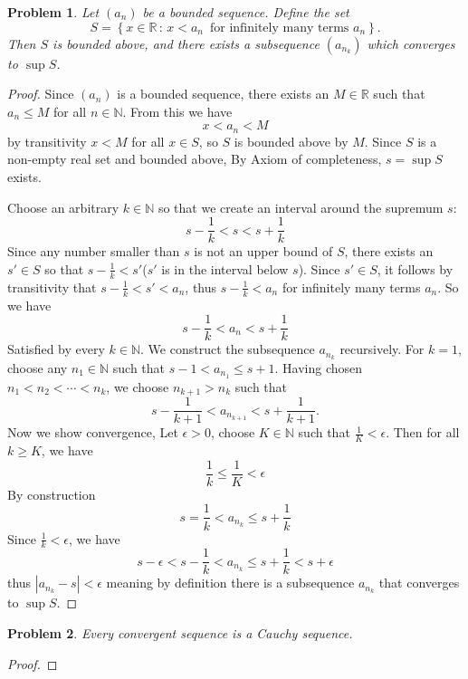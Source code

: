 \documentclass[12pt]{article}
\newtheorem{problem}{Problem}
\newcommand{\NN}{\ensuremath{\mathbb N}}
\newcommand{\RR}{\ensuremath{\mathbb R}}
\newcommand{\eps}{\ensuremath{\epsilon}}
\begin{document}
\begin{problem} %
Let $(a_n)$ be a bounded sequence.  Define the set
	$$S = \left\{x\in\RR\,:\, x < a_n \,\text{ for infinitely many terms } a_n\right\}.$$
Then $S$ is bounded above, and there exists a subsequence $(a_{n_k})$ which converges to $\sup S$.
\end{problem}
\begin{proof}
Since $(a_n)$ is a bounded sequence, there exists an $M \in \RR$ such that $a_n \leq M$ for all $n \in \NN$. From this we have
$$x < a_n < M$$
by transitivity $x < M$ for all $x \in S$, so $S$ is bounded above by $M$. Since $S$ is a non-empty real set and bounded above, By Axiom of completeness, $s = \sup S$ exists.

Choose an arbitrary $k \in \NN$ so that we create an interval around the supremum $s$: $$s-\frac{1}{k} < s < s+\frac{1}{k}$$ Since any number smaller than $s$ is not an upper bound of $S$, there exists an $s' \in S$ so that $s-\frac{1}{k} < s'$($s'$ is in the interval below $s$). Since $s' \in S$, it follows by transitivity that $s-\frac{1}{k} < s' < a_n$, thus $s-\frac{1}{k} < a_n$ for infinitely many terms $a_n$. So we have $$s-\frac{1}{k} < a_n < s + \frac{1}{k}$$ Satisfied by every $k \in \NN$. We construct the subsequence $a_{n_k}$ recursively.
For $k = 1$, choose any $n_1 \in \NN$ such that $s - 1 < a_{n_1} \leq s + 1$. Having chosen 
$n_1 < n_2 < \cdots < n_k$, we choose $n_{k+1} > n_k$ such that 
$$s - \frac{1}{k+1} < a_{n_{k+1}} < s + \frac{1}{k+1}.$$ Now we show convergence, Let $\eps > 0$, choose $K \in \NN$ such that $\frac{1}{K} < \eps$. Then for all $k \geq K$, we have
$$\frac{1}{k} \leq \frac{1}{K} < \eps$$
By construction
$$s = \frac{1}{k} < a_{n_k} \leq s + \frac{1}{k}$$
Since $\frac{1}{k} < \eps$, we have
$$ s- \eps < s - \frac{1}{k} < a_{n_k} \leq s + \frac{1}{k} < s + \eps$$
thus $|a_{n_k} - s| < \eps$ meaning by definition there is a subsequence $a_{n_k}$ that converges to $\sup S$.
\end{proof}


\begin{problem} %
Every convergent sequence is a Cauchy sequence.
\end{problem}


\begin{proof}
\end{proof}
\end{document}
